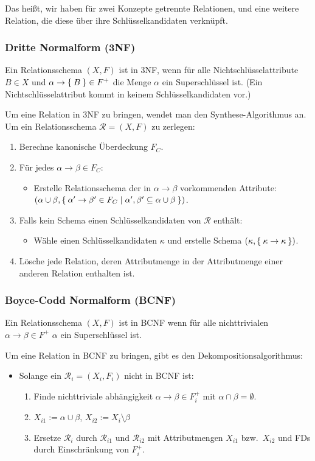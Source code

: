 \documentclass[a4paper,parskip=half*,DIV=15,fontsize=11pt]{scrartcl}
\begin{document}
Das heißt, wir haben für zwei Konzepte getrennte Relationen, und eine weitere Relation, die diese über ihre Schlüsselkandidaten verknüpft.

\subsubsection{Dritte Normalform (3NF)}
Ein Relationsschema $(X, F)$ ist in 3NF, wenn für alle Nichtschlüsselattribute $B \in X$ und $\alpha \to \Set{B} \in F^+$ die Menge $\alpha$ ein Superschlüssel ist. (Ein Nichtschlüsselattribut kommt in keinem Schlüsselkandidaten vor.)

Um eine Relation in 3NF zu bringen, wendet man den Synthese-Algorithmus an. Um ein Relationsschema $\mathcal{R} = (X,F)$ zu zerlegen:
\begin{enumerate}
\item Berechne kanonische Überdeckung $F_C$.
\item Für jedes $\alpha \to \beta \in F_C$:
\begin{itemize}
\item[] Erstelle Relationsschema der in $\alpha \to \beta$ vorkommenden Attribute:\\ $(\alpha \cup \beta, \Set{\alpha' \to \beta' \in F_C | \alpha', \beta' \subseteq \alpha \cup \beta})$.
\end{itemize}
\item Falls kein Schema einen Schlüsselkandidaten von $\mathcal{R}$ enthält:
\begin{itemize}
\item[] Wähle einen Schlüsselkandidaten $\kappa$ und erstelle Schema $(\kappa, \Set{\kappa \to \kappa})$.
\end{itemize}
\item Lösche jede Relation, deren Attributmenge in der Attributmenge einer anderen Relation enthalten ist.
\end{enumerate}

\subsubsection{Boyce-Codd Normalform (BCNF)}
Ein Relationsschema $(X, F)$ ist in BCNF wenn für alle nichttrivialen $\alpha \to \beta \in F^+$ $\alpha$ ein Superschlüssel ist.

Um eine Relation in BCNF zu bringen, gibt es den Dekompositionsalgorithmus:
\begin{itemize}
\item[] Solange ein $\mathcal{R}_i = (X_i, F_i)$ nicht in BCNF ist:
\begin{enumerate}
\item Finde nichttriviale abhängigkeit $\alpha \to \beta \in F_i^+$ mit $\alpha \cap \beta = \emptyset$.
\item $X_{i1} := \alpha \cup \beta$, $X_{i2} := X_i \setminus \beta$
\item Ersetze $\mathcal{R}_i$ durch $\mathcal{R}_{i1}$ und $\mathcal{R}_{i2}$ mit Attributmengen $X_{i1}$ bzw.\ $X_{i2}$ und FDs durch Einschränkung von $F_i^+$.
\end{enumerate}
\end{itemize}
\end{document}
